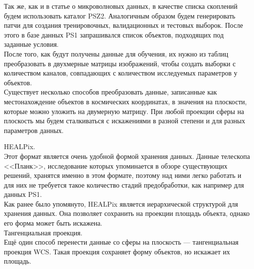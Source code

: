 \documentclass{article}
\begin{document}
Так же, как и в статье о микроволновых данных, в качестве списка скоплений будем использовать каталог PSZ2. 
Аналогичным образом будем генерировать патчи для создания тренировочных, валидационных и тестовых 
выборок. 
После этого в базе данных PS1 запрашивался список объектов, подходящих под заданные 
условия. \\

После того, как будут получены данные для обучения, их нужно из таблиц преобразовать в двухмерные 
матрицы изображений, чтобы создать выборки с количеством каналов, совпадающих с количеством 
исследуемых параметров у объектов. \\

Существует несколько способов преобразовать данные, записанные как местонахождение объектов в космических
координатах, в значения на плоскости, которые можно уложить на двумерную матрицу. При любой проекции 
сферы на плоскость мы будем сталкиваться с искажениями в разной степени и для разных параметров данных.

HEALPix.\\
Этот формат является очень удобной формой хранения данных. Данные телескопа <<Планк>>, исследование
которых упоминается в обзоре существующих решений, хранятся именно в этом формате, поэтому над ними 
легко работать и для них не требуется такое количество стадий предобработки, как например для данных 
PS1. \\

Как ранее было упомянуто, HEALPix является иерархической структурой для хранения данных. Она 
позволяет сохранить на проекции площадь объекта, однако его форма может быть искажена. \\

Тангенциальная проекция. \\
Ещё один способ перенести данные со сферы на плоскость --- тангенциальная проекция WCS. Такая 
проекция сохраняет форму объектов, но искажает их площадь.\\
\end{document}
